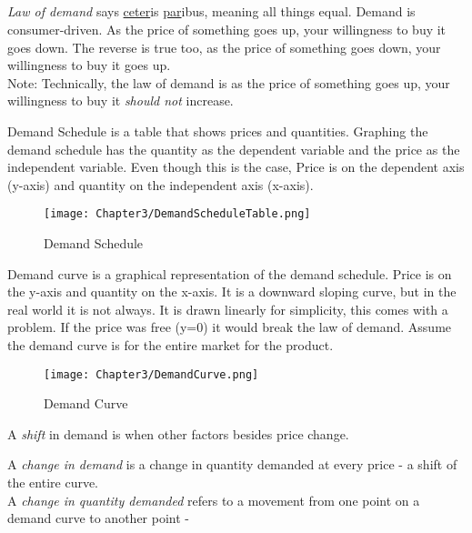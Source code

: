 \subsection{}

\begin{definition}
    \emph{Law of demand} says \underline{ceter}is \underline{par}ibus, meaning all things equal. Demand is consumer-driven.
    As the price of something goes up, your willingness to buy it goes down. The reverse is true too,
    as the price of something goes down, your willingness to buy it goes up.\\
    Note: Technically, the law of demand is as the price of something goes up, your willingness to buy it \emph{should not} increase.
\end{definition}
\begin{definition}
    Demand Schedule is a table that shows prices and quantities. Graphing the demand schedule has the 
    quantity as the dependent variable and the price as the independent variable. Even though this is the case,
    Price is on the dependent axis (y-axis) and quantity on the independent axis (x-axis).
\end{definition}
\begin{figure}[H]
    \centering
    \texttt{[image: Chapter3/DemandScheduleTable.png]}
    \caption{Demand Schedule}
\end{figure}
\begin{definition}
    Demand curve is a graphical representation of the demand schedule. Price is on the y-axis and quantity on the x-axis.
    It is a downward sloping curve, but in the real world it is not always. It is drawn linearly for simplicity, this comes with a problem.
    If the price was free (y=0) it would break the law of demand. Assume the demand curve is for the entire market for the product.
\end{definition}
\begin{figure}[H]
    \centering
    \texttt{[image: Chapter3/DemandCurve.png]}
    \caption{Demand Curve}
\end{figure}
\begin{definition}
    A \emph{shift} in demand is when other factors besides price change.
\end{definition}
A \emph{change in demand} is a change in quantity demanded at every price - a shift of the entire curve.\\
A \emph{change in quantity demanded} refers to a movement from one point on a demand curve to another point -
